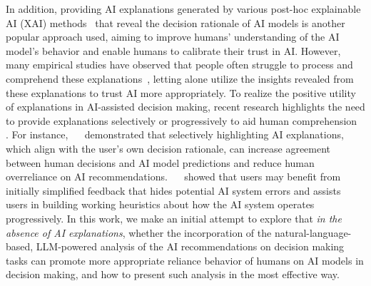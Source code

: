 In addition, providing AI explanations generated by various post-hoc explainable AI (XAI) methods~\cite{10.1145/2939672.2939778,10.5555/3295222.3295230} that reveal the decision rationale of AI models is another popular approach used, %
aiming to improve humans' understanding of the AI model's behavior and enable humans to calibrate their trust in AI. 
However, many empirical studies have observed that people often struggle to process and comprehend these explanations~\cite{vasconcelos2023explanations,lee2023understanding,wang2021explanations,li2024utilizing}, letting alone utilize the insights revealed from these explanations to trust AI more appropriately. %
To realize the positive utility of explanations in AI-assisted decision making, recent research highlights the need to provide explanations selectively or progressively to aid human comprehension~\cite{feng-boyd-graber-2022-learning,10.1145/3610206,springer2020progressive,springer2019progressive,li2024utilizing} . For instance, ~\citeauthor{10.1145/3610206}~\cite{10.1145/3610206} demonstrated that selectively highlighting AI explanations, which align with the user’s own decision rationale, can increase agreement between human decisions and AI model predictions and reduce human overreliance on AI recommendations. ~\citeauthor{springer2019progressive}~\cite{springer2019progressive} showed that users may benefit from
initially simplified feedback that hides potential AI system errors and assists users in building working heuristics about how the AI system operates progressively. In this work, we make an initial attempt to explore that \textit{in the absence of AI explanations}, whether the incorporation of the natural-language-based, LLM-powered analysis of the AI recommendations on decision making tasks %
can promote more appropriate reliance behavior of humans on AI models in decision making, and how to present such analysis in the most effective way.



